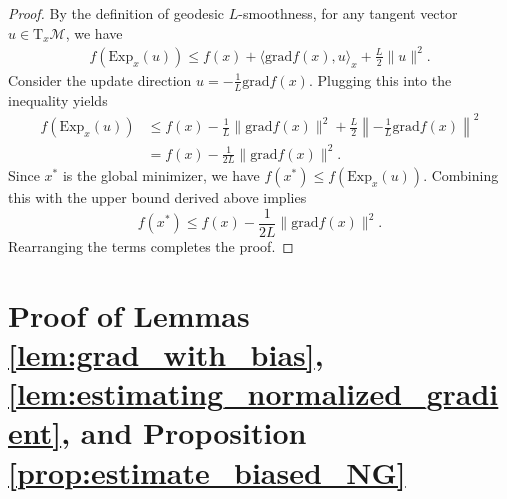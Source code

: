 \documentclass{article}
\newcommand{\rgrad}{\mathrm{grad}}
\theoremstyle{plain}
\theoremstyle{definition}
\theoremstyle{remark}
\begin{document}
\begin{proof}
By the definition of geodesic ${L}$-smoothness, for any tangent vector $u \in \mathrm{T}_{x}\mathcal{M}$, we have
\begin{align*}
    f(\mathrm{Exp}_{x}(u)) \leq f(x) + \langle \rgrad f(x), u \rangle_{x} + \frac{L}{2}\|u\|^2.
\end{align*}
Consider the update direction $u = -\frac{1}{L}\rgrad f(x)$. Plugging this into the inequality yields
\begin{align*}
    f(\mathrm{Exp}_{x}(u)) 
    &\leq f(x) - \frac{1}{L}\|\rgrad f(x)\|^2 + \frac{L}{2}\left\|-\frac{1}{L}\rgrad f(x)\right\|^2 \\
    &= f(x) - \frac{1}{2L}\|\rgrad f(x)\|^2.
\end{align*}
Since $x^*$ is the global minimizer, we have $f(x^*) \leq f(\mathrm{Exp}_{x}(u))$. Combining this with the upper bound derived above implies
$$f(x^*) \leq f(x) - \frac{1}{2L}\|\rgrad f(x)\|^2.$$
Rearranging the terms completes the proof.
\end{proof}



\section{Proof of Lemmas \ref{lem:grad_with_bias}, \ref{lem:estimating_normalized_gradient}, and Proposition \ref{prop:estimate_biased_NG}}
\end{document}
